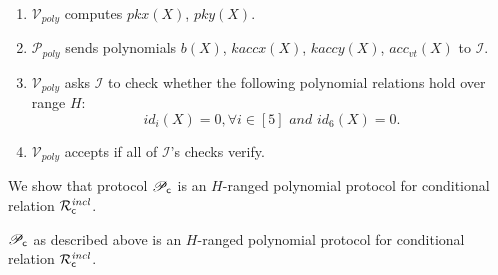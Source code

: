 \begin{enumerate}
\item $\mathcal{V}_{poly}$ computes $pkx(X)$, $pky(X)$.
\item $\mathcal{P}_{poly}$ sends polynomials $b(X)$, $kaccx(X)$, $kaccy(X)$, $acc_{vt}(X)$ to $\mathcal{I}$. 
\item $\mathcal{V}_{poly}$ asks $\mathcal{I}$ to check whether the following polynomial relations hold over range $H$:
$$id_i(X) = 0, \forall i \in [5] \textit{ and } id_6(X) = 0.$$ 
\item $\mathcal{V}_{poly}$ accepts if all of $\mathcal{I}$'s checks verify. 
\end{enumerate}

\noindent We show that protocol $\mathscr{P}_{\mathsf{c}}$ is an $H$-ranged polynomial protocol for conditional relation 
$\mathcal{R}^{\mathit{incl}}_{\mathsf{c}}$. 

\begin{lemma} $\mathscr{P}_{\mathsf{c}}$ as described above is an $H$-ranged polynomial protocol for conditional relation $\mathcal{R}^{\mathit{incl}}_{\mathsf{c}}$.
\end{lemma}

